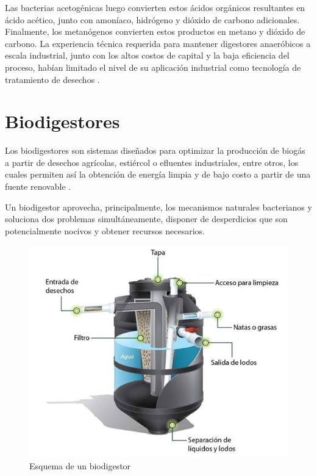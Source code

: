 \documentclass[a4paper,10pt]{article}
\begin{document}
Las bacterias acetogénicas luego convierten estos ácidos orgánicos resultantes en ácido acético, junto con amoníaco, hidrógeno y dióxido de carbono adicionales. Finalmente, los metanógenos convierten estos productos en metano y dióxido de carbono. La experiencia técnica requerida para mantener digestores anaeróbicos a escala industrial, junto con los altos costos de capital y la baja eficiencia del proceso, habían limitado el nivel de su aplicación industrial como tecnología de tratamiento de desechos \cite{Ionel2010}.

\section{Biodigestores}
Los biodigestores son sistemas diseñados para optimizar la producción de biogás a partir de desechos agrícolas, estiércol o efluentes industriales, entre otros, los cuales permiten así la obtención de energía limpia y de bajo costo a partir de una fuente renovable \cite{RivasSolano2010}.

Un biodigestor aprovecha, principalmente, los mecanismos naturales bacterianos y soluciona dos problemas simultáneamente, disponer de desperdicios que son potencialmente nocivos y obtener recursos necesarios.

\begin{figure}[H]
\centering
\includegraphics[scale=.65]{ImagenBiodigestor}
\caption{Esquema de un biodigestor \cite{Autores2013}}
\label{Figura 1}
\end{figure}
\end{document}
